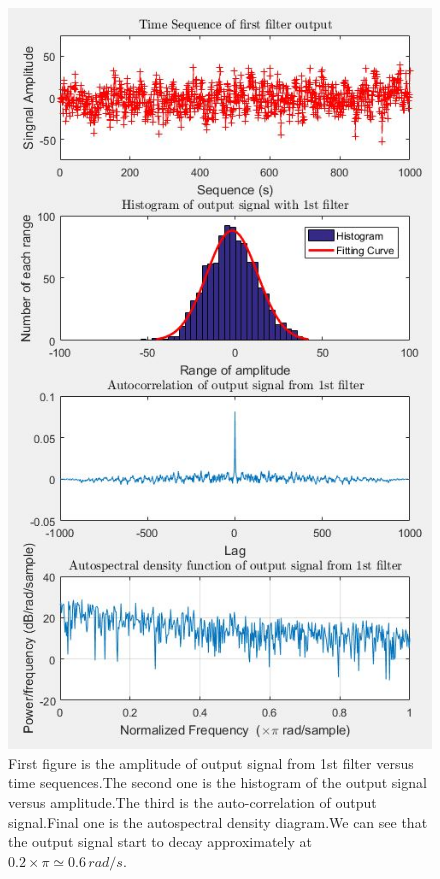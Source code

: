 \documentclass[12pt,a4paper]{article}
\begin{document}
			\begin{figure}[H]
				\centering
				\includegraphics[scale=0.8]{Problem2f}
				\caption[Properties of the output signal from the 1st filter]{First figure is the amplitude of output signal from 1st filter versus time sequences.The second one is the histogram of the output signal versus amplitude.The third is the auto-correlation of output signal.Final one is the autospectral density diagram.We can see that the output signal start to decay approximately at $0.2\times\pi\simeq0.6\,rad/s.$ }
			\end{figure}
\end{document}
